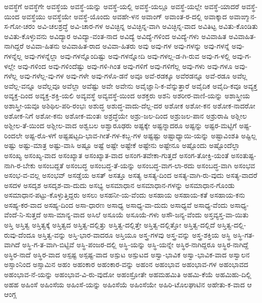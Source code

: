 ಅವಸ್ಥೆಗೆ
ಅವಸ್ಥೆಗೇ
ಅವಸ್ಥೆಯ
ಅವಸ್ಥೆ-ಯನ್ನು
ಅವಸ್ಥೆ-ಯಲ್ಲಿ
ಅವಸ್ಥೆ-ಯಲ್ಲೂ
ಅವಸ್ಥೆ-ಯಲ್ಲೇ
ಅವಸ್ಥೆ-ಯಾದರೆ
ಅವಸ್ಥೆ-ಯಿಂದ
ಅವಸ್ಥೆಯು
ಅವಸ್ಥೆಯೇ
ಅವಸ್ಥೆ-ಯೊಂದು
ಅವಹೇ-ಳನ
ಅವಾಂಗ್
ಅವಾಂತ-ರ-ದಲ್ಲಿ
ಅವಾಕ್ಕಾದ
ಅವಾಙ್ಮಾನ-ಸ-ಗೋ-ಚರಂ
ಅವಿ-ಚಲಶ್ರದ್ಧೆ
ಅವಿ-ಚಾರ-ಗಳ
ಅವಿಚ್ಛಿನ್ನ
ಅವಿಚ್ಛಿನ್ನ-ವಾಗಿ
ಅವಿಚ್ಛಿನ್ನ-ವಾದ
ಅವಿತಿಟ್ಟ
ಅವಿತು-ಕೊಂಡಿತು
ಅವಿತು-ಕೊಳ್ಳುವನು
ಅವಿದ್ಯಾರ
ಅವಿದ್ಯಾ-ವಂತ-ನಾದ
ಅವಿದ್ಯೆ
ಅವಿದ್ಯೆ-ಗಳಿಂದ
ಅವಿದ್ಯೆ-ಗಳು
ಅವಿವಾಹಿತ
ಅವಿವಾಹಿತ-ನಾಗಿದ್ದರೆ
ಅವಿವಾ-ಹಿತನು
ಅವಿವಾಹಿತ-ರಾದ
ಅವಿವಾ-ಹಿತರು
ಅವು
ಅವು-ಗಳ
ಅವು-ಗಳನ್ನು
ಅವು-ಗಳನ್ನೆ
ಅವು-ಗಳನ್ನೆಲ್ಲ
ಅವು-ಗಳನ್ನೆಲ್ಲಾ
ಅವು-ಗಳನ್ನೊಂದಿಷ್ಟು
ಅವು-ಗಳನ್ನೋದಿ
ಅವು-ಗಳಲ್ಲ-ಡ-ಗಿ-ರುವ
ಅವು-ಗ-ಳಲ್ಲಿ
ಅವು-ಗ-ಳಲ್ಲೇ
ಅವು-ಗಳಿಂದ
ಅವು-ಗಳಿಂದೆಷ್ಟು
ಅವು-ಗಳಿ-ಗಿಂತ
ಅವು-ಗಳಿಗೆ
ಅವು-ಗಳಿಗೆಲ್ಲ
ಅವು-ಗಳು
ಅವು-ಗಳೂ
ಅವು-ಗಳೆಲ್ಲ
ಅವು-ಗಳೆಲ್ಲ-ವು-ಗಳ
ಅವು-ಗಳೇ
ಅವು-ಗಳೊ-ಡನೆ
ಅವೂ
ಅವೆ-ರಡಕ್ಕೂ
ಅವೆರಡನ್ನೂ
ಅವೆ-ರಡೂ
ಅವೆಲ್ಲ
ಅವೆಲ್ಲ-ವನ್ನೂ
ಅವೆಲ್ಲವೂ
ಅವೆಲ್ಲಾ
ಅವೆಷ್ಟು
ಅವೇ
ಅವೇನು
ಅವೈಜ್ಞಾನಿ-ಕ-ವೆನ್ನುತ್ತಾರೆ
ಅವೈದಿಕ
ಅವೈದಿ-ಕವೂ
ಅವ್ಯಕ್ತ
ಅವ್ಯಕ್ತ-ದಿಂದ
ಅವ್ಯಕ್ತ-ಶಕ್ತಿ-ಯಲಿ
ಅವ್ಯವಸ್ಥೆ
ಅವ್ಯವಸ್ಥೆ-ಯಿಂದ
ಅಶಕ್ತರು
ಅಶನಿ
ಅಶರೀರ-ವಾಣಿ-ಯನ್ನು
ಅಶಾಸ್ತ್ರೀಯ
ಅಶಾಸ್ತ್ರೀ-ಯವೂ
ಅಶಿಥಿಲ-ಪರಿ-ರಂಭಃ
ಅಶುದ್ಧ
ಅಶುದ್ಧ-ವಾದು-ದೆಲ್ಲ-ದರ
ಅಶೋಕ
ಅಶೋ-ಕನ
ಅಶೋಕ-ನಾದರೋ
ಅಶೋಕ-ನಿಗೆ
ಅಶೋ-ಕನು
ಅಶೋಕ-ಮಂತಃ
ಅಶ್ರದ್ಧೆಯೇ
ಅಶ್ರು-ಜಲ-ದಿಂದ
ಅಶ್ರುಜಲ-ಪಾನ
ಅಶ್ರುರಾಷಿ
ಅಶ್ಲೀಲ
ಅಶ್ಲೀಲ-ತೆ-ಯಿಂದ
ಅಶ್ಲೀಲ-ವಾದ
ಅಶ್ವಬಲ
ಅಶ್ವಾರೂಢರು
ಅಷ್ಟಕ್ಕೇ
ಅಷ್ಟನ್ನಾದರೂ
ಅಷ್ಟನ್ನು
ಅಷ್ಟರ-ಮಟ್ಟಿಗೆ
ಅಷ್ಟ-ರಿಂದಲೇ
ಅಷ್ಟ-ರೊ-ಳಗೆ
ಅಷ್ಟಷಟ್ಟದಿ-ಭಾವ-ಗೀತೆ-ಗಳ-ಕಬ್ಬ-ಗಳ
ಅಷ್ಟಷ್ಟು
ಅಷ್ಟಾಧ್ಯಾಯಿ-ಯನ್ನು
ಅಷ್ಟಾವಿಂಶತಿ
ಅಷ್ಟಿಲ್ಲ
ಅಷ್ಟು
ಅಷ್ಟು-ಮಾತ್ರ
ಅಷ್ಟು-ವಾಸಿ
ಅಷ್ಟೂ
ಅಷ್ಟೆ
ಅಷ್ಟೇ
ಅಷ್ಟೇಕೆ
ಅಷ್ಟೇನು
ಅಷ್ಟೇನೂ
ಅಷ್ಟೊಂದು
ಅಷ್ಟೊಂದೆಲ್ಲಾ
ಅಸಂಖ್ಯ
ಅಸಂಖ್ಯ-ವಾದ
ಅಸಂಖ್ಯಾತ
ಅಸಂಖ್ಯಾತ-ವಾದ
ಅಸಂಗ-ತವೇಕಾ-ಗುತ್ತದೆ
ಅಸಂಗ-ತೋಕ್ತಿ-ಯಂತೆ
ಅಸಂತುಷ್ಟ-ನಾಗಿ-ರ-ಬೇಕು
ಅಸಂಬದ್ದತೆ
ಅಸಂಬದ್ಧ
ಅಸಂಬದ್ಧ-ತೆ-ಯನ್ನು
ಅಸಂಬದ್ಧ-ವಾಗ-ಲಾ-ರದು
ಅಸಂಬದ್ಧ-ವಾಗಿ
ಅಸಂಭವ
ಅಸಂಭ-ವ-ವಲ್ಲ
ಅಸಂಭವ್
ಅಸಡ್ಡೆಯ
ಅಸತ್
ಅಸತ್ತೂ
ಅಸತ್ಯ
ಅಸತ್ಯ-ದಿಂದ
ಅಸತ್ಯ-ವಾಗಿ-ರು-ವುದು
ಅಸತ್ಯ-ವಾದರೆ
ಅಸದಳ
ಅಸದೃಶ
ಅಸದೃಶ-ವಾ-ದುದು
ಅಸಭ್ಯ
ಅಸಮಾಧಾನ
ಅಸಮಾಧಾನ-ಗಳನ್ನು
ಅಸಮಾಧಾನ-ಗೊಂಡು
ಅಸಮಾಧಾನ-ಪಟ್ಟು-ಕೊಳ್ಳುತ್ತಿದ್ದರು
ಅಸಲು
ಅಸಹನೀ-ಯ-ವೆಂದು
ಅಸಹಾಯ
ಅಸಹಾಯ-ಕತೆ
ಅಸಹಾಯ-ಕನು
ಅಸಹ್ಯ-ಕರ-ವಾದ
ಅಸಹ್ಯ-ದಿಂದ
ಅಸಾ-ಧಾರಣ
ಅಸಾಧ್ಯ
ಅಸಾಧ್ಯ-ವಾ-ದುದು
ಅಸಾಧ್ಯವೆ
ಅಸಾಧ್ಯ-ವೆಂದು
ಅಸಾಧ್ಯ-ವೆಂದೆ-ನಿ-ಸುತ್ತದೆ
ಅಸಾ-ಮಾನ್ಯ-ವಾದ
ಅಸಿಲೆ
ಅಸೂಯೆ
ಅಸೂಯೆ-ಗಳು
ಅಸೌ-ಜನ್ಯ-ವೆಂದು
ಅಸ್ತವ್ಯಸ್ತ-ವಾ-ಯಿತು
ಅಸ್ತಿ
ಅಸ್ತಿತ್ವ
ಅಸ್ತಿತ್ವಕ್ಕೆ
ಅಸ್ತಿತ್ವದ
ಅಸ್ತಿತ್ವ-ದಲ್ಲಿತ್ತು
ಅಸ್ತಿತ್ವ-ದಲ್ಲಿತ್ತೇ
ಅಸ್ತಿತ್ವ-ದಲ್ಲಿತ್ತೋ
ಅಸ್ತಿತ್ವ-ದಲ್ಲಿದೆ
ಅಸ್ತಿತ್ವ-ದಲ್ಲಿ-ರುವು-ದೆಂದೂ
ಅಸ್ತಿತ್ವ-ವನ್ನು
ಅಸ್ತಿ-ಭಾರ-ವಾದರೂ
ಅಸ್ತಿಯೂ
ಅಸ್ತ್ರ-ಗಳವು
ಅಸ್ತ್ರ-ವನ್ನು
ಅಸ್ತ್ರ-ಶಕ್ತಿಯ
ಅಸ್ಥಿ
ಅಸ್ಥಿ-ಗತ-ವಾಗಿದೆ
ಅಸ್ಥಿ-ಗ-ತ-ವಾಗಿ-ಬಿಟ್ಟಿವೆ
ಅಸ್ಥಿ-ಪಂಜರ-ದಲ್ಲಿ
ಅಸ್ಥಿ-ಯನ್ನು
ಅಸ್ಥಿ-ಯನ್ನೇ
ಅಸ್ಥಿರ-ನಾಗಿದ್ದರೂ
ಅಸ್ಥಿರ-ನಾಗಿದ್ದೆ
ಅಸ್ಥಿರ-ನಾದೆ
ಅಸ್ಥಿರ-ವಾದ
ಅಸ್ಪಷ್ಟ
ಅಸ್ಪಷ್ಟ-ವಾದ
ಅಸ್ಪುಟ
ಅಸ್ಪುಟದ
ಅಸ್ವಾ-ಭಾವಿಕ
ಅಸ್ವಾ-ಭಾವಿಕ-ವಾದ
ಅಸ್ವಾಲನ
ಅಸ್ಸಾಂನಿಂದ
ಅಸ್ಸಾಮಿನ
ಅಹಂ
ಅಹಂಕಾರ
ಅಹಂಕಾರ-ವನ್ನು
ಅಹಂನ
ಅಹಂಭಾವ
ಅಹಂಭಾವ-ಗಳ
ಅಹಂಭಾವದ
ಅಹಂಭಾವ-ನೆ-ಯನ್ನು
ಅಹಂಭಾವ-ವಿ-ರು-ವುದೋ
ಅಹಂಸ್ರೋತೇ
ಅಹಮಹಮಿತಿ
ಅಹಮಿ-ಕೆಯೆ
ಅಹಮಿಹು-ದಿಲ್ಲಿ
ಅಹಹ
ಅಹಿಂಸೆ
ಅಹಿಂಸೆಯ
ಅಹಿಂಸೆ-ಯನ್ನು
ಅಹಿಂಸೆಯೆ
ಅಹಿಂಸೆಯೇ
ಅಹಿರಿ-ಟೊಲಘಾಟಿನ
ಅಹೇತು-ಕ-ವಾದ
ಆ
ಆಂಗ್ಲ
